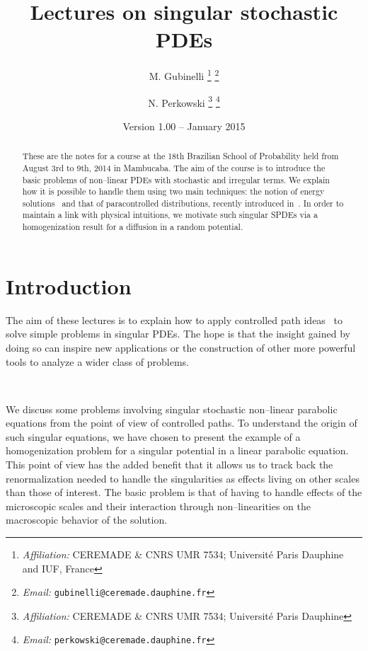 \documentclass[a4paper,11pt]{article}
\newcommand{\tmSep}{; }
\newcommand{\tmaffiliation}[1]{\thanks{\textit{Affiliation:} #1}}
\newcommand{\tmemail}[1]{\thanks{\textit{Email:} \texttt{#1}}}
\begin{document}
\title{\bf{Lectures on singular stochastic PDEs}}

\author{
  M. Gubinelli
  \tmaffiliation{CEREMADE \& CNRS UMR 7534{\tmSep}
  Universit{\'e} Paris Dauphine and IUF, France}
  \tmemail{gubinelli@ceremade.dauphine.fr}
  \and
  N. Perkowski
  \tmaffiliation{CEREMADE \& CNRS UMR 7534{\tmSep}
  Universit{\'e} Paris Dauphine}
  \tmemail{perkowski@ceremade.dauphine.fr}
}

\date{Version 1.00 -- January 2015}

\maketitle

\begin{abstract}
  These are the notes for a course at the 18th Brazilian School of Probability
  held from August 3rd to 9th, 2014 in Mambucaba. The aim of the course is to
  introduce the basic problems of non--linear PDEs with stochastic and
  irregular terms. We explain how it is possible to handle them using two main
  techniques: the notion of energy
  solutions~{\cite{goncalves_universality_2010,gubinelli_regularization_2013}}
  and that of paracontrolled distributions, recently introduced
  in~{\cite{Gubinelli2012}}. In order to maintain a link with physical
  intuitions, we motivate such singular SPDEs via a homogenization result for
  a diffusion in a random potential. \ 
\end{abstract}

{\tableofcontents}

\section{Introduction}

The aim of these lectures is to explain how to apply controlled path
ideas~{\cite{Gubinelli2004}} to solve simple problems in singular PDEs. The
hope is that the insight gained by doing so can inspire new applications or
the construction of other more powerful tools to analyze a wider class of
problems.

\

We discuss some problems involving singular stochastic non--linear parabolic
equations from the point of view of controlled paths. To understand the origin
of such singular equations, we have chosen to present the example of a
homogenization problem for a singular potential in a linear parabolic
equation. This point of view has the added benefit that it allows us to track
back the renormalization needed to handle the singularities as effects living
on other scales than those of interest. The basic problem is that of having to
handle effects of the microscopic scales and their interaction through
non--linearities on the macroscopic behavior of the solution.
\end{document}
